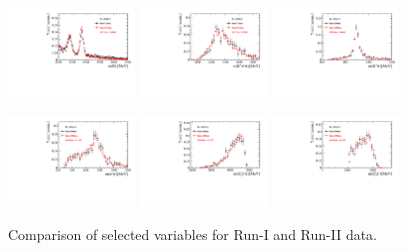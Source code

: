 \begin{figure}[h]
\includegraphics[height=!,width=0.3\textwidth]{figs/dataVsMC/run1vs2_signal/Ds2all_Bs_DTF_MM.pdf}
\includegraphics[height=!,width=0.3\textwidth]{figs/dataVsMC/run1vs2_signal/Ds2all_m_Kpipi.pdf}
\includegraphics[height=!,width=0.3\textwidth]{figs/dataVsMC/run1vs2_signal/Ds2all_m_Kpi.pdf}

\includegraphics[height=!,width=0.3\textwidth]{figs/dataVsMC/run1vs2_signal/Ds2all_m_pipi.pdf}
\includegraphics[height=!,width=0.3\textwidth]{figs/dataVsMC/run1vs2_signal/Ds2all_m_Dspipi.pdf}
\includegraphics[height=!,width=0.3\textwidth]{figs/dataVsMC/run1vs2_signal/Ds2all_m_Dspi.pdf}


\caption{Comparison of selected variables for Run-I and Run-II data.}
\label{fig:}
\end{figure}

